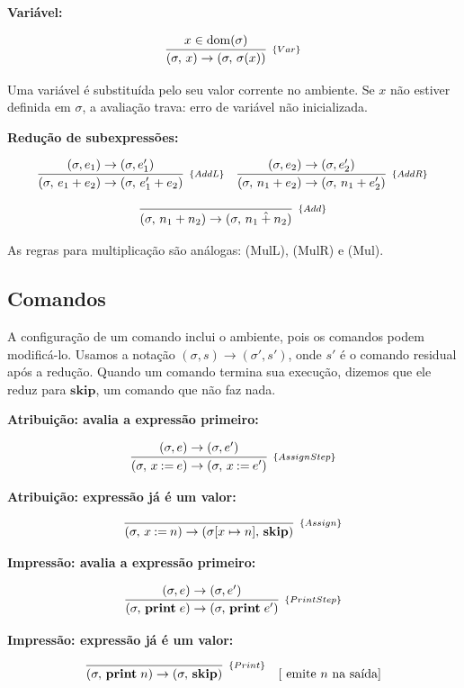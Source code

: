\textbf{Variável:}

\[
  \infer[_{\{Var\}}]{(\sigma,\, x) \to (\sigma,\, \sigma(x))}{x \in
  \mathrm{dom}(\sigma)}
\]

Uma variável é substituída pelo seu valor corrente no ambiente. Se
\(x\) não estiver definida em \(\sigma\), a avaliação trava: erro
de variável não inicializada.

\textbf{Redução de subexpressões:}

\[
  \begin{array}{cc}
    \infer[_{\{AddL\}}]{(\sigma,\, e_1 + e_2) \to (\sigma,\, e_1' +
    e_2)}{(\sigma, e_1) \to (\sigma, e_1')}
    &
    \infer[_{\{AddR\}}]{(\sigma,\, n_1 + e_2) \to (\sigma,\, n_1 +
    e_2')}{(\sigma, e_2) \to (\sigma, e_2')}
  \end{array}
\]

\[
  \infer[_{\{Add\}}]{(\sigma,\, n_1 + n_2) \to (\sigma,\, n_1
  \mathbin{\hat{+}} n_2)}{}
\]

As regras para multiplicação são análogas: (MulL), (MulR) e (Mul).

\subsection{Comandos}

A configuração de um comando inclui o ambiente, pois os comandos
podem modificá-lo. Usamos a notação \((\sigma, s) \to (\sigma',
s')\), onde \(s'\) é o comando residual após a redução. Quando um
comando termina sua execução, dizemos que ele reduz para
\(\mathbf{skip}\), um comando que não faz nada.

\textbf{Atribuição: avalia a expressão primeiro:}

\[
  \infer[_{\{AssignStep\}}]{(\sigma,\, x \mathbin{:=} e)\to
  (\sigma,\, x \mathbin{:=} e')}{(\sigma, e) \to (\sigma, e')}
\]

\textbf{Atribuição: expressão já é um valor:}

\[
  \infer[_{\{Assign\}}]{(\sigma,\, x \mathbin{:=} n) \to (\sigma[x \mapsto n],\,
  \mathbf{skip})}{}
\]

\textbf{Impressão: avalia a expressão primeiro:}

\[
  \infer[_{\{PrintStep\}}]{(\sigma,\, \mathbf{print}\; e)\to
  (\sigma,\, \mathbf{print}\; e')}{(\sigma, e) \to (\sigma, e')}
\]

\textbf{Impressão: expressão já é um valor:}

\[
  \infer[_{\{Print\}}]{(\sigma,\, \mathbf{print}\; n) \to (\sigma,\,
  \mathbf{skip})}{}
  \quad [\text{ emite $n$ na saída}]
\]

